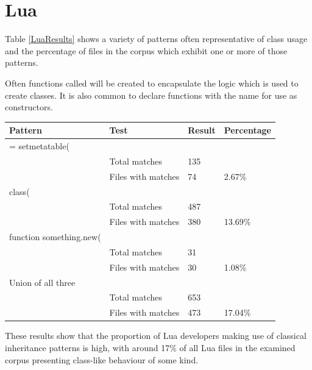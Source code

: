 \section{Lua}
Table \ref{LuaResults} shows a variety of patterns often representative of class usage and the percentage of files in the corpus which exhibit one or more of those patterns.\newline

Often functions called  will be created to encapsulate the  logic which is used to create classes. It is also common to declare functions with the name  for use as constructors.

\begin{center}
	\label{LuaResults}
	\begin{tabular}{|l|l|l|l|}
		\hline
		Pattern                 & Test               & Result & Percentage \\ \hline
		= setmetatable(        &                    &        &            \\ \hline
		& Total matches      & 135    &            \\ \hline
		& Files with matches & 74     & 2.67\%     \\ \hline
		class(                  &                    &        &            \\ \hline
		& Total matches      & 487    &            \\ \hline
		& Files with matches & 380    & 13.69\%    \\ \hline
		function something.new( &                    &        &            \\ \hline
		& Total matches      & 31     &            \\ \hline
		& Files with matches & 30     & 1.08\%     \\ \hline
		Union of all three      &                    &        &            \\ \hline
		& Total matches      & 653    &            \\ \hline
		& Files with matches & 473    & 17.04\%    \\ \hline
	\end{tabular}
	\newline\newline
\end{center}

These results show that the proportion of Lua developers making use of classical inheritance patterns is high, with around 17\% of all Lua files in the examined corpus presenting class-like behaviour of some kind.



